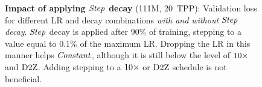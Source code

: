 \begin{figure}
  \centering
  \mbox{}
  \vspace{-2mm}
  \mbox{}
  \caption{\textbf{Impact of applying $\mbox{\emph{Step}}$ decay} (111M, 20~TPP):
    Validation loss for different LR and decay combinations \emph{with
    and without $\mbox{\emph{Step}}$ decay}.  $\mbox{\emph{Step}}$ decay is applied after 90\%
    of training, stepping to a value equal to 0.1\% of the maximum LR\@.
    Dropping the LR in this manner helps $\mbox{\emph{Constant}}$, although it is
    still below the level of $\mbox{10}\times$ and $\mbox{D2Z}$.  Adding stepping to
    a $\mbox{10}\times$ or $\mbox{D2Z}$ schedule is not
    beneficial.\label{fig:maxlr_step.curves}}
\end{figure}
